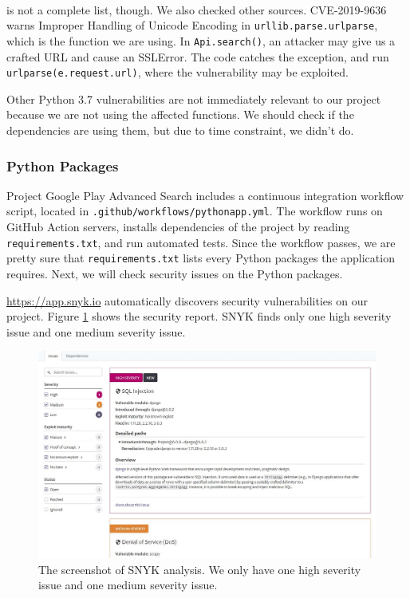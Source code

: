 \documentclass[12pt, a4paper]{article}
\newcommand{\code}[1]{\texttt{#1}}
\begin{document}
\cite{python37-vulnerability} is not a complete list, though. We also checked other sources. CVE-2019-9636\textsuperscript{\cite{CVE-2019-9636}} warns Improper Handling of Unicode Encoding in \code{urllib\linebreak[0].parse\linebreak[0].urlparse}, which is the function we are using. In \code{Api.search()}, an attacker may give us a crafted URL and cause an SSLError. The code catches the exception, and run \code{urlparse(e.request.url)}, where the vulnerability may be exploited.

Other Python 3.7 vulnerabilities are not immediately relevant to our project because we are not using the affected functions. We should check if the dependencies are using them, but due to time constraint, we didn't do.



\subsubsection{Python Packages}
Project Google Play Advanced Search includes a continuous integration workflow script, located in \code{.github/workflows/pythonapp.yml}. The workflow runs on GitHub Action servers, installs dependencies of the project by reading \code{requirements.txt}, and run automated tests. Since the workflow passes, we are pretty sure that \code{requirements.txt} lists every Python packages the application requires. Next, we will check security issues on the Python packages.

\url{https://app.snyk.io} automatically discovers security vulnerabilities on our project. Figure \ref{fig:snyk} shows the security report. SNYK finds only one high severity issue and one medium severity issue. 

\begin{figure}[ht]
\centering
\includegraphics[width=\textwidth]{snyk.JPG}
\caption{The screenshot of SNYK analysis. We only have one high severity issue and one medium severity issue.}
\label{fig:snyk}
\end{figure}
\end{document}
